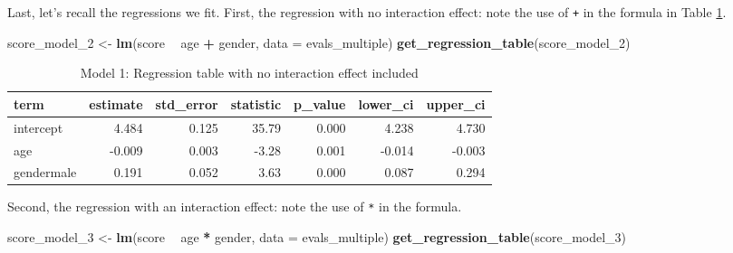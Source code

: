 \documentclass[12pt, krantz2,]{krantz}
\makeatletter
\newenvironment{Shaded}{\begin{snugshade}}{\end{snugshade}}
\newcommand{\DataTypeTok}[1]{\textcolor[rgb]{0.27,0.27,0.27}{#1}}
\newcommand{\DecValTok}[1]{\textcolor[rgb]{0.06,0.06,0.06}{#1}}
\newcommand{\KeywordTok}[1]{\textcolor[rgb]{0.27,0.27,0.27}{\textbf{#1}}}
\newcommand{\NormalTok}[1]{#1}
\newcommand{\OperatorTok}[1]{\textcolor[rgb]{0.43,0.43,0.43}{\textbf{#1}}}
\newcommand{\StringTok}[1]{\textcolor[rgb]{0.5,0.5,0.5}{#1}}
\newenvironment{kframe}{%
\medskip{}
\setlength{\fboxsep}{.8em}
 \def\at@end@of@kframe{}%
 \ifinner\ifhmode%
  \def\at@end@of@kframe{\end{minipage}}%
  \begin{minipage}{\columnwidth}%
 \fi\fi%
 \def\FrameCommand##1{\hskip\@totalleftmargin \hskip-\fboxsep
 \colorbox{shadecolor}{##1}\hskip-\fboxsep
     \hskip-\linewidth \hskip-\@totalleftmargin \hskip\columnwidth}%
 \MakeFramed {\advance\hsize-\width
   \@totalleftmargin\z@ \linewidth\hsize
   \@setminipage}}%
 {\par\unskip\endMakeFramed%
 \at@end@of@kframe}
\renewenvironment{Shaded}{\begin{kframe}}{\end{kframe}}
\makeatother
\begin{document}
Last, let's recall the regressions we fit. First, the regression with no
interaction effect: note the use of \texttt{+} in the formula in Table \ref{tab:modelmultireg}.

\begin{Shaded}
\begin{Highlighting}[]
\NormalTok{score_model_}\DecValTok{2}\NormalTok{ <-}\StringTok{ }\KeywordTok{lm}\NormalTok{(score }\OperatorTok{~}\StringTok{ }\NormalTok{age }\OperatorTok{+}\StringTok{ }\NormalTok{gender, }\DataTypeTok{data =}\NormalTok{ evals_multiple)}
\KeywordTok{get_regression_table}\NormalTok{(score_model_}\DecValTok{2}\NormalTok{)}
\end{Highlighting}
\end{Shaded}

\begin{table}[H]

\caption{\label{tab:modelmultireg}Model 1: Regression table with no interaction effect included}
\centering
\fontsize{10}{12}\selectfont
\begin{tabular}{lrrrrrr}
\toprule
term & estimate & std\_error & statistic & p\_value & lower\_ci & upper\_ci\\
\midrule
intercept & 4.484 & 0.125 & 35.79 & 0.000 & 4.238 & 4.730\\
age & -0.009 & 0.003 & -3.28 & 0.001 & -0.014 & -0.003\\
gendermale & 0.191 & 0.052 & 3.63 & 0.000 & 0.087 & 0.294\\
\bottomrule
\end{tabular}
\end{table}

Second, the regression with an interaction effect: note the use of \texttt{*} in the formula.

\begin{Shaded}
\begin{Highlighting}[]
\NormalTok{score_model_}\DecValTok{3}\NormalTok{ <-}\StringTok{ }\KeywordTok{lm}\NormalTok{(score }\OperatorTok{~}\StringTok{ }\NormalTok{age }\OperatorTok{*}\StringTok{ }\NormalTok{gender, }\DataTypeTok{data =}\NormalTok{ evals_multiple)}
\KeywordTok{get_regression_table}\NormalTok{(score_model_}\DecValTok{3}\NormalTok{)}
\end{Highlighting}
\end{Shaded}
\end{document}
